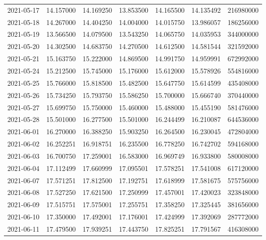 \begin{tabular}{lrrrrrr}
2021-05-17 &   14.157000 &   14.169250 &   13.853500 &   14.165500 &   14.135492 &   216980000 \\
2021-05-18 &   14.267000 &   14.404250 &   14.004000 &   14.015750 &   13.986057 &   186256000 \\
2021-05-19 &   13.566500 &   14.079500 &   13.543250 &   14.065750 &   14.035953 &   344000000 \\
2021-05-20 &   14.302500 &   14.683750 &   14.270500 &   14.612500 &   14.581544 &   321592000 \\
2021-05-21 &   15.163750 &   15.222000 &   14.869500 &   14.991750 &   14.959991 &   672992000 \\
2021-05-24 &   15.212500 &   15.745000 &   15.176000 &   15.612000 &   15.578926 &   554816000 \\
2021-05-25 &   15.766000 &   15.818500 &   15.482500 &   15.647750 &   15.614599 &   435408000 \\
2021-05-26 &   15.734250 &   15.793750 &   15.586250 &   15.700000 &   15.666740 &   370440000 \\
2021-05-27 &   15.699750 &   15.750000 &   15.460000 &   15.488000 &   15.455190 &   581476000 \\
2021-05-28 &   15.501000 &   16.277500 &   15.501000 &   16.244499 &   16.210087 &   644536000 \\
2021-06-01 &   16.270000 &   16.388250 &   15.903250 &   16.264500 &   16.230045 &   472804000 \\
2021-06-02 &   16.252251 &   16.918751 &   16.235500 &   16.778250 &   16.742702 &   594168000 \\
2021-06-03 &   16.700750 &   17.259001 &   16.583000 &   16.969749 &   16.933800 &   580008000 \\
2021-06-04 &   17.112499 &   17.660999 &   17.095501 &   17.578251 &   17.541008 &   617120000 \\
2021-06-07 &   17.571251 &   17.812500 &   17.192751 &   17.618999 &   17.581675 &   575756000 \\
2021-06-08 &   17.527250 &   17.621500 &   17.250999 &   17.457001 &   17.420023 &   323848000 \\
2021-06-09 &   17.515751 &   17.575001 &   17.255751 &   17.358250 &   17.325445 &   381656000 \\
2021-06-10 &   17.350000 &   17.492001 &   17.176001 &   17.424999 &   17.392069 &   287772000 \\
2021-06-11 &   17.479500 &   17.939251 &   17.443750 &   17.825251 &   17.791567 &   416308000 \\

\end{tabular}

